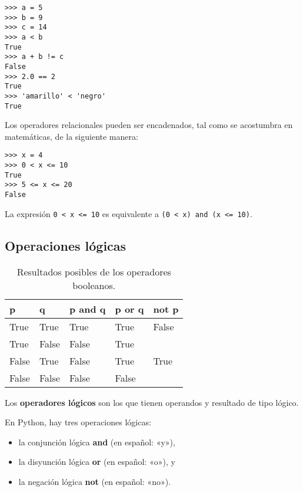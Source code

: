 \begin{lstlisting}
>>> a = 5
>>> b = 9
>>> c = 14
>>> a < b
True
>>> a + b != c
False
>>> 2.0 == 2
True
>>> 'amarillo' < 'negro'
True
\end{lstlisting}

Los operadores relacionales pueden ser encadenados, tal como se acostumbra en
matemáticas, de la siguiente manera:

\begin{lstlisting}
>>> x = 4
>>> 0 < x <= 10
True
>>> 5 <= x <= 20
False
\end{lstlisting}

La expresión \lstinline!0 < x <= 10! es equivalente a
\lstinline!(0 < x) and (x <= 10)!.

\subsection{Operaciones lógicas}

\begin{table}
  \centering
  \begin{tabular}{*{5}{l}}
    \toprule
    p     & q       & p and q & p or q & not p \\
    \midrule
    True  & True    & True    & True   & False \\
    True  & False   & False   & True   &       \\
    False & True    & False   & True   & True  \\
    False & False   & False   & False  &       \\
    \bottomrule
  \end{tabular}
  \caption{Resultados posibles de los operadores booleanos.}
  \label{tbl:operadores-booleanos}
\end{table}

Los \textbf{operadores lógicos} son los que tienen operandos y resultado
de tipo lógico.

En Python, hay tres operaciones lógicas:

\begin{itemize}
\item
  la conjunción lógica \textbf{and} (en español: «y»),
\item
  la disyunción lógica \textbf{or} (en español: «o»), y
\item
  la negación lógica \textbf{not} (en español: «no»).
\end{itemize}

